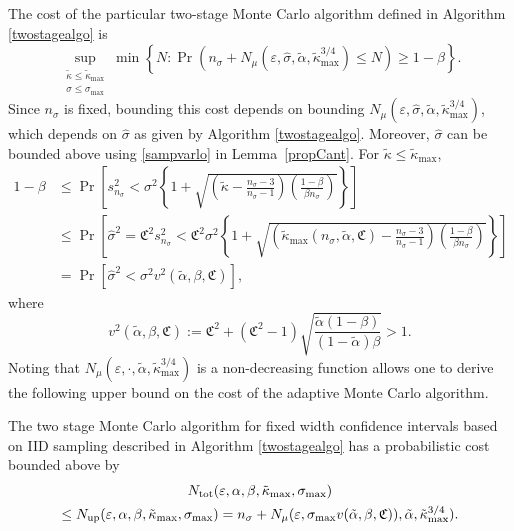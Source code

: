 \documentclass[graybox]{svmult}
\newcommand{\fudge}{\mathfrak{C}}
\newcommand{\Prob}{\Pr}
\newcommand{\hsigma}{\hat{\sigma}}
\newcommand{\talpha}{\tilde{\alpha}}
\newcommand{\tkappa}{\tilde{\kappa}}
\begin{document}
The cost of the particular two-stage Monte Carlo algorithm defined in Algorithm \ref{twostagealgo} is
\begin{equation}
\sup_{\substack{\tkappa \le \tkappa_{\max} \\ \sigma \le \sigma_{\max}}} \min\left\{N : \Prob(n_{\sigma} + N_{\mu}(\varepsilon,\hsigma,\tilde\alpha,\tilde\kappa_{\max}^{3/4}) \le N) \ge 1-\beta  \right \}.
\end{equation}
Since $n_{\sigma}$ is fixed, bounding this cost depends on bounding $N_{\mu}(\varepsilon,\hsigma,\tilde\alpha,\tilde\kappa_{\max}^{3/4})$, which depends on $\hsigma$ as given by Algorithm \ref{twostagealgo}.  Moreover, $\hsigma$ can be bounded above using \eqref{sampvarlo} in Lemma~\ref{propCant}.  For $\tkappa \le \tkappa_{\max}$, 
\begin{align*}
1-\beta & \le \Prob\left[s^2_{n_{\sigma}} < \sigma^2 \left\{1 + \sqrt{\left ( \tkappa  - \frac{n_{\sigma}-3}{n_{\sigma}-1}\right)\left(\frac{1-\beta}{\beta n_{\sigma}}\right)}\right\} \right] \\
& \le \Prob\left[\hsigma^2 = \fudge^2 s^2_{n_{\sigma}} < \fudge^2\sigma^2 \left\{1 + \sqrt{\left ( \tkappa_{\max}(n_{\sigma},\talpha,\fudge)  - \frac{n_{\sigma}-3}{n_{\sigma}-1}\right)\left(\frac{1-\beta}{\beta n_{\sigma}}\right)}\right\} \right] \\
& = \Prob\left[\hsigma^2 < \sigma^2 v^2(\talpha,\beta,\fudge) \right],
\end{align*}
where
\[
v^2(\talpha,\beta,\fudge) :=  \fudge^2 + \left(\fudge^2 - 1\right)\sqrt{\frac{ \talpha(1-\beta)}{(1-\talpha)\beta} } > 1.
\]
Noting that $N_{\mu}(\varepsilon,\cdot,\tilde\alpha,\tilde\kappa_{\max}^{3/4})$ is a non-decreasing function allows one to derive the following upper bound on the cost of the adaptive Monte Carlo algorithm.

\begin{theorem} \label{costtheorem} The two stage Monte Carlo algorithm for fixed width confidence intervals based on IID sampling described in Algorithm \ref{twostagealgo} has a probabilistic cost bounded above by 
\begin{multline*}
N_{\rm{tot}}(\varepsilon,\alpha, \beta, \tkappa_{\max}, \sigma_{\max}) \\
\le
N_{\rm{up}}(\varepsilon,\alpha, \beta, \tkappa_{\max}, \sigma_{\max}) =  n_{\sigma} + N_{\mu}(\varepsilon,\sigma_{\max}v(\talpha,\beta,\fudge)),\talpha,\tkappa_{\max}^{3/4}) .
\end{multline*} 
\end{theorem}
\end{document}
